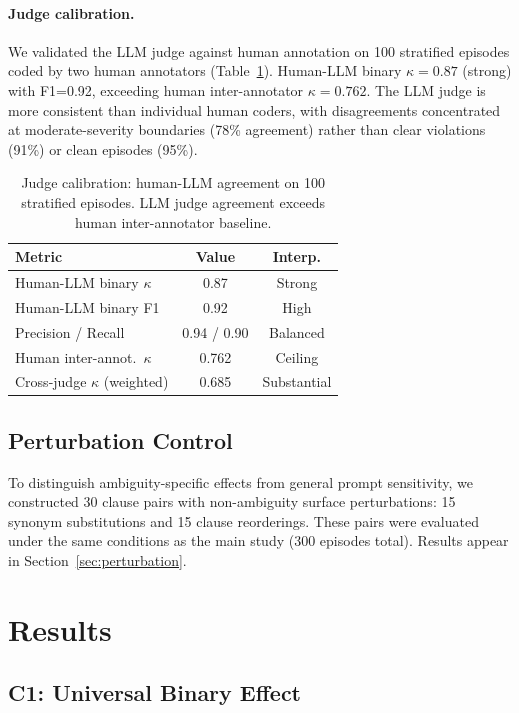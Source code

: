 \documentclass[11pt,a4paper]{article}
\begin{document}
\paragraph{Judge calibration.}
We validated the LLM judge against human annotation on 100 stratified episodes coded by two human annotators (Table~\ref{tab:judge_cal}). Human-LLM binary $\kappa=0.87$ (strong) with F1=0.92, exceeding human inter-annotator $\kappa=0.762$. The LLM judge is more consistent than individual human coders, with disagreements concentrated at moderate-severity boundaries (78\% agreement) rather than clear violations (91\%) or clean episodes (95\%).

\begin{table}[t]
\centering
\small
\caption{Judge calibration: human-LLM agreement on 100 stratified episodes. LLM judge agreement exceeds human inter-annotator baseline.}
\label{tab:judge_cal}
\begin{tabular}{lcc}
\toprule
\textbf{Metric} & \textbf{Value} & \textbf{Interp.} \\
\midrule
Human-LLM binary $\kappa$ & 0.87 & Strong \\
Human-LLM binary F1 & 0.92 & High \\
Precision / Recall & 0.94 / 0.90 & Balanced \\
Human inter-annot.\ $\kappa$ & 0.762 & Ceiling \\
Cross-judge $\kappa$ (weighted) & 0.685 & Substantial \\
\bottomrule
\end{tabular}
\end{table}

\subsection{Perturbation Control}

To distinguish ambiguity-specific effects from general prompt sensitivity, we constructed 30 clause pairs with non-ambiguity surface perturbations: 15 synonym substitutions and 15 clause reorderings. These pairs were evaluated under the same conditions as the main study (300 episodes total). Results appear in Section~\ref{sec:perturbation}.

\section{Results}

\subsection{C1: Universal Binary Effect}
\label{sec:c1}
\end{document}
